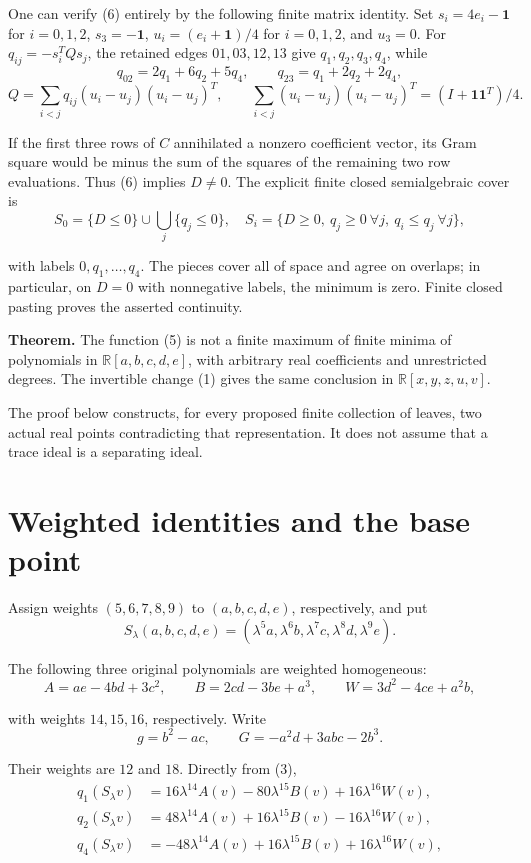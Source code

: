 \documentclass[11pt]{article}
\begin{document}
One can verify (6) entirely by the following finite matrix identity. Set
\(s_i=4e_i-\mathbf1\) for \(i=0,1,2\), \(s_3=-\mathbf1\),
\(u_i=(e_i+\mathbf1)/4\) for \(i=0,1,2\), and \(u_3=0\).
For \(q_{ij}=-s_i^TQs_j\), the retained edges \(01,03,12,13\)
give \(q_1,q_2,q_3,q_4\), while
\[
q_{02}=2q_1+6q_2+5q_4,\qquad
q_{23}=q_1+2q_2+2q_4,
\]
\[
Q=\sum_{i<j}q_{ij}(u_i-u_j)(u_i-u_j)^T,
\qquad
\sum_{i<j}(u_i-u_j)(u_i-u_j)^T=(I+\mathbf1\mathbf1^T)/4.
\tag{7}
\]

If the first three rows of \(C\) annihilated a nonzero coefficient vector,
its Gram square would be minus the sum of the squares of the remaining
two row evaluations. Thus (6) implies \(D\ne0\). The explicit finite
closed semialgebraic cover is
\[
S_0=\{D\le0\}\cup\bigcup_j\{q_j\le0\},
\quad
S_i=\{D\ge0,\ q_j\ge0\ \forall j,\ q_i\le q_j\ \forall j\},
\tag{8}
\]

with labels \(0,q_1,\ldots,q_4\). The pieces cover all of space and
agree on overlaps; in particular, on \(D=0\) with nonnegative labels,
the minimum is zero. Finite closed pasting proves the asserted continuity.

\textbf{Theorem.} The function (5) is not a finite maximum of finite minima of
polynomials in \(\mathbb R[a,b,c,d,e]\), with arbitrary real coefficients
and unrestricted degrees. The invertible change (1) gives the same conclusion
in \(\mathbb R[x,y,z,u,v]\).

The proof below constructs, for every proposed finite collection of leaves,
two actual real points contradicting that representation. It does not
assume that a trace ideal is a separating ideal.

\section{Weighted identities and the base point}

Assign weights \((5,6,7,8,9)\) to \((a,b,c,d,e)\), respectively, and put
\[
S_\lambda(a,b,c,d,e)
 =(\lambda^5a,\lambda^6b,\lambda^7c,\lambda^8d,\lambda^9e).
\tag{9}
\]

The following three original polynomials are weighted homogeneous:
\[
A=ae-4bd+3c^2,\qquad
B=2cd-3be+a^3,\qquad
W=3d^2-4ce+a^2b,
\tag{10}
\]

with weights \(14,15,16\), respectively. Write
\[
g=b^2-ac,\qquad G=-a^2d+3abc-2b^3.
\tag{11}
\]

Their weights are \(12\) and \(18\). Directly from (3),
\[
\begin{split}
q_1(S_\lambda v)&=16\lambda^{14}A(v)-80\lambda^{15}B(v)
                                      +16\lambda^{16}W(v),\\
q_2(S_\lambda v)&=48\lambda^{14}A(v)+16\lambda^{15}B(v)
                                      -16\lambda^{16}W(v),\\
q_4(S_\lambda v)&=-48\lambda^{14}A(v)+16\lambda^{15}B(v)
                                      +16\lambda^{16}W(v),
\end{split}
\tag{12}
\]
\end{document}

